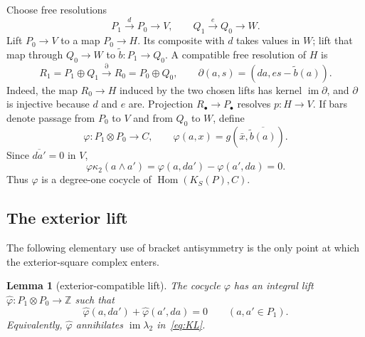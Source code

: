 \documentclass[11pt]{amsart}
\newtheorem{lemma}[theorem]{Lemma}
\theoremstyle{remark}
\newcommand{\Z}{\mathbb Z}
\newcommand{\Hom}{\operatorname{Hom}}
\newcommand{\im}{\operatorname{im}}
\begin{document}
Choose free resolutions
\[
 P_1\xrightarrow dP_0\longrightarrow V,
 \qquad
 Q_1\xrightarrow eQ_0\longrightarrow W.
\]
Lift $P_0\to V$ to a map $P_0\to H$.  Its composite with $d$ takes
values in $W$; lift that map through $Q_0\to W$ to
$\widetilde b:P_1\to Q_0$.  A compatible free resolution of $H$ is
\begin{equation}\label{eq:R}
 R_1=P_1\oplus Q_1\xrightarrow{\partial}R_0=P_0\oplus Q_0,
 \qquad
 \partial(a,s)=(da,es-\widetilde b(a)).
\end{equation}
Indeed, the map $R_0\to H$ induced by the two chosen lifts has kernel
$\im\partial$, and $\partial$ is injective because $d$ and $e$ are.
Projection $R_\bullet\to P_\bullet$ resolves $p:H\to V$.  If bars
denote passage from $P_0$ to $V$ and from $Q_0$ to $W$, define
\begin{equation}\label{eq:phi}
 \varphi:P_1\otimes P_0\longrightarrow C,
 \qquad
 \varphi(a,x)=g(\bar x,\overline{\widetilde b(a)}).
\end{equation}
Since $\overline{da'}=0$ in $V$,
\[
 \varphi\kappa_2(a\wedge a')
   =\varphi(a,da')-\varphi(a',da)=0.
\]
Thus $\varphi$ is a degree-one cocycle of $\Hom(K_S(P),C)$.

\subsection{The exterior lift}

The following elementary use of bracket antisymmetry is the only point
at which the exterior-square complex enters.

\begin{lemma}[exterior-compatible lift]\label{lem:exterior}
The cocycle $\varphi$ has an integral lift
$\widehat\varphi:P_1\otimes P_0\to\Z$ such that
\begin{equation}\label{eq:exterior}
 \widehat\varphi(a,da')+\widehat\varphi(a',da)=0
 \qquad(a,a'\in P_1).
\end{equation}
Equivalently, $\widehat\varphi$ annihilates
$\im\lambda_2$ in~\eqref{eq:KL}.
\end{lemma}
\end{document}
